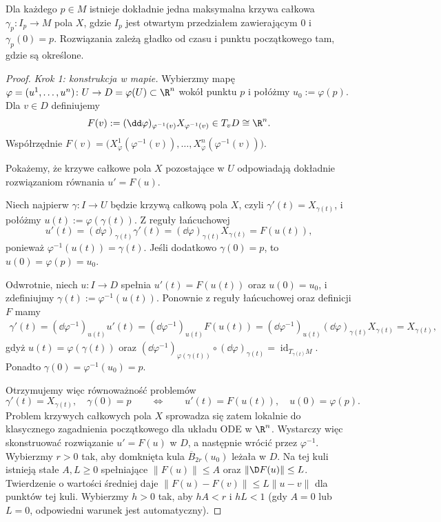 \begin{twierdzenie}
\label{thm:ode}
Dla każdego $p\in M$ istnieje dokładnie jedna maksymalna krzywa
całkowa $\gamma_p\colon I_p\to M$ pola $X$, gdzie $I_p$ jest otwartym
przedziałem zawierającym $0$ i $\gamma_p(0)=p$.
Rozwiązania zależą gładko od czasu i punktu początkowego tam,
gdzie są określone.
\end{twierdzenie}
\begin{proof}
\emph{Krok 1: konstrukcja w mapie.}
Wybierzmy mapę $\varphi=(u^1,\ldots,u^n)\colon U\to D=\varphi(U)\subset\R^n$
wokół punktu $p$ i połóżmy $u_0:=\varphi(p)$. Dla $v\in D$ definiujemy
\[
F(v):=(\dd\varphi)_{\varphi^{-1}(v)}
X_{\varphi^{-1}(v)}\in T_vD\cong\R^n.
\]
Współrzędnie
$F(v)=\bigl(X_\varphi^1(\varphi^{-1}(v)),\ldots,
X_\varphi^n(\varphi^{-1}(v))\bigr)$.

Pokażemy, że krzywe całkowe pola $X$ pozostające w $U$ odpowiadają
dokładnie rozwiązaniom równania $u'=F(u)$.

Niech najpierw $\gamma\colon I\to U$ będzie krzywą całkową pola $X$,
czyli $\gamma'(t)=X_{\gamma(t)}$, i połóżmy
$u(t):=\varphi(\gamma(t))$. Z reguły łańcuchowej
\[
u'(t)
=(\dd\varphi)_{\gamma(t)}\gamma'(t)
=(\dd\varphi)_{\gamma(t)}X_{\gamma(t)}
=F(u(t)),
\]
ponieważ $\varphi^{-1}(u(t))=\gamma(t)$. Jeśli dodatkowo
$\gamma(0)=p$, to $u(0)=\varphi(p)=u_0$.

Odwrotnie, niech $u\colon I\to D$ spełnia $u'(t)=F(u(t))$ oraz
$u(0)=u_0$, i zdefiniujmy $\gamma(t):=\varphi^{-1}(u(t))$.
Ponownie z reguły łańcuchowej oraz definicji $F$ mamy
\begin{align*}
\gamma'(t)
=(\dd\varphi^{-1})_{u(t)}u'(t)
=(\dd\varphi^{-1})_{u(t)}F(u(t))
=(\dd\varphi^{-1})_{u(t)}
  (\dd\varphi)_{\gamma(t)}X_{\gamma(t)}
=X_{\gamma(t)},
\end{align*}
gdyż $u(t)=\varphi(\gamma(t))$ oraz
$(\dd\varphi^{-1})_{\varphi(\gamma(t))}
\circ(\dd\varphi)_{\gamma(t)}
=\operatorname{id}_{T_{\gamma(t)}M}$.
Ponadto $\gamma(0)=\varphi^{-1}(u_0)=p$.

Otrzymujemy więc równoważność problemów
\[
\gamma'(t)=X_{\gamma(t)},\quad \gamma(0)=p
\qquad\Longleftrightarrow\qquad
u'(t)=F(u(t)),\quad u(0)=\varphi(p).
\]
Problem krzywych całkowych pola $X$ sprowadza się zatem lokalnie
do klasycznego zagadnienia początkowego dla układu ODE w $\R^n$.
Wystarczy więc skonstruować rozwiązanie $u'=F(u)$ w $D$,
a następnie wrócić przez $\varphi^{-1}$.
Wybierzmy $r>0$ tak, aby domknięta kula
$\overline B_{2r}(u_0)$ leżała w $D$.
Na tej kuli istnieją stałe $A,L\geq 0$ spełniające
$\|F(u)\|\leq A$ oraz $\|\D F(u)\|\leq L$.
Twierdzenie o wartości średniej daje
$\|F(u)-F(v)\|\leq L\|u-v\|$ dla punktów tej kuli.
Wybierzmy $h>0$ tak, aby $hA<r$ i $hL<1$
(gdy $A=0$ lub $L=0$, odpowiedni warunek jest automatyczny).


\end{proof}
